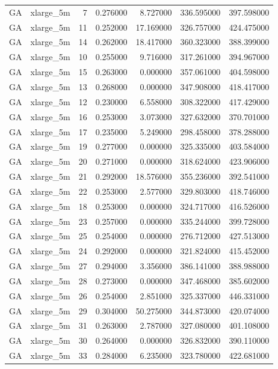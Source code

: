 \begin{tabular}{llrrrrr}
GA & xlarge_5m & 7 & 0.276000 & 8.727000 & 336.595000 & 397.598000 \\
GA & xlarge_5m & 11 & 0.252000 & 17.169000 & 326.757000 & 424.475000 \\
GA & xlarge_5m & 14 & 0.262000 & 18.417000 & 360.323000 & 388.399000 \\
GA & xlarge_5m & 10 & 0.255000 & 9.716000 & 317.261000 & 394.967000 \\
GA & xlarge_5m & 15 & 0.263000 & 0.000000 & 357.061000 & 404.598000 \\
GA & xlarge_5m & 13 & 0.268000 & 0.000000 & 347.908000 & 418.417000 \\
GA & xlarge_5m & 12 & 0.230000 & 6.558000 & 308.322000 & 417.429000 \\
GA & xlarge_5m & 16 & 0.253000 & 3.073000 & 327.632000 & 370.701000 \\
GA & xlarge_5m & 17 & 0.235000 & 5.249000 & 298.458000 & 378.288000 \\
GA & xlarge_5m & 19 & 0.277000 & 0.000000 & 325.335000 & 403.584000 \\
GA & xlarge_5m & 20 & 0.271000 & 0.000000 & 318.624000 & 423.906000 \\
GA & xlarge_5m & 21 & 0.292000 & 18.576000 & 355.236000 & 392.541000 \\
GA & xlarge_5m & 22 & 0.253000 & 2.577000 & 329.803000 & 418.746000 \\
GA & xlarge_5m & 18 & 0.253000 & 0.000000 & 324.717000 & 416.526000 \\
GA & xlarge_5m & 23 & 0.257000 & 0.000000 & 335.244000 & 399.728000 \\
GA & xlarge_5m & 25 & 0.254000 & 0.000000 & 276.712000 & 427.513000 \\
GA & xlarge_5m & 24 & 0.292000 & 0.000000 & 321.824000 & 415.452000 \\
GA & xlarge_5m & 27 & 0.294000 & 3.356000 & 386.141000 & 388.988000 \\
GA & xlarge_5m & 28 & 0.273000 & 0.000000 & 347.468000 & 385.602000 \\
GA & xlarge_5m & 26 & 0.254000 & 2.851000 & 325.337000 & 446.331000 \\
GA & xlarge_5m & 29 & 0.304000 & 50.275000 & 344.873000 & 420.074000 \\
GA & xlarge_5m & 31 & 0.263000 & 2.787000 & 327.080000 & 401.108000 \\
GA & xlarge_5m & 30 & 0.264000 & 0.000000 & 326.832000 & 390.110000 \\
GA & xlarge_5m & 33 & 0.284000 & 6.235000 & 323.780000 & 422.681000 \\

\end{tabular}
